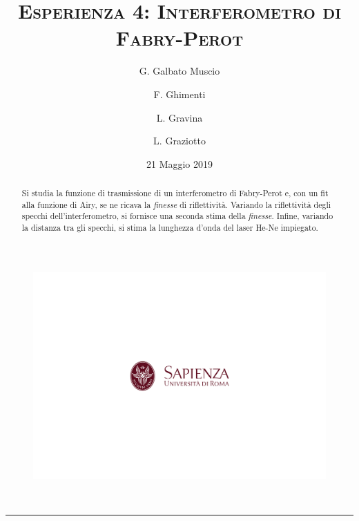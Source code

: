 \documentclass[10pt,oneside,a4paper]{article}
\title{\textsc{\textbf{Esperienza 4}: Interferometro di Fabry-Perot}}
\author{\small{G. Galbato Muscio} \and \small{F. Ghimenti} \and \small{L. Gravina} \and \small{L. Graziotto}}
\date{21 Maggio 2019}
\begin{document}
	\begin{figure}
		\centering
		\includegraphics[scale=0.5, trim={2.8cm 8.9cm 0 9cm}, clip]{logo.png}
	\end{figure}
	\maketitle
	\begin{center} 
		 \\
	\end{center}
\hrule
\vfill
\renewcommand{\abstractname}{Abstract}
\begin{abstract}
Si studia la funzione di trasmissione di un interferometro di Fabry-Perot e, con un fit alla funzione di Airy, se ne ricava la \emph{finesse} di riflettività. Variando la riflettività degli specchi dell'interferometro, si fornisce una seconda stima della \emph{finesse}. Infine, variando la distanza tra gli specchi, si stima la lunghezza d'onda del laser He-Ne impiegato.
\end{abstract}
\vfill
\tableofcontents %
\newpage


\pagebreak
\end{document}
